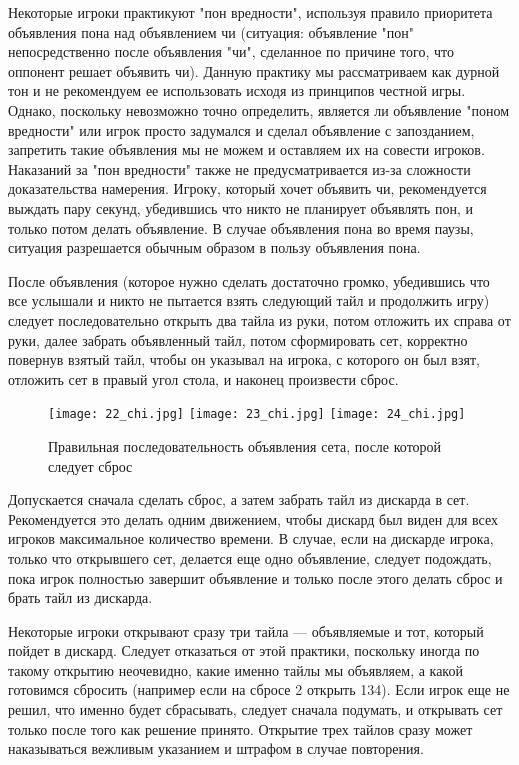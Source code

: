Некоторые игроки практикуют "пон вредности", используя правило приоритета объявления пона над объявлением чи (ситуация: объявление "пон" непосредственно после объявления "чи", сделанное по причине того, что оппонент решает объявить чи). Данную практику мы рассматриваем как дурной тон и не рекомендуем ее использовать исходя из принципов честной игры. Однако, поскольку невозможно точно определить, является ли объявление "поном вредности" или игрок просто задумался и сделал объявление с запозданием, запретить такие объявления мы не можем и оставляем их на совести игроков. Наказаний за "пон вредности" также не предусматривается из-за сложности доказательства намерения. Игроку, который хочет объявить чи, рекомендуется выждать пару секунд, убедившись что никто не планирует объявлять пон, и только потом делать объявление. В случае объявления пона во время паузы, ситуация разрешается обычным образом в пользу объявления пона.

После объявления (которое нужно сделать достаточно громко, убедившись что все услышали и никто не пытается взять следующий тайл и продолжить игру) следует последовательно открыть два тайла из руки, потом отложить их справа от руки, далее забрать объявленный тайл, потом сформировать сет, корректно повернув взятый тайл, чтобы он указывал на игрока, с которого он был взят, отложить сет в правый угол стола, и наконец произвести сброс.

\begin{figure}[H]
	\centering
	\texttt{[image: 22\_chi.jpg]}
	\texttt{[image: 23\_chi.jpg]}
	\texttt{[image: 24\_chi.jpg]}
	\caption{Правильная последовательность объявления сета, после которой следует сброс}
\end{figure}

Допускается сначала сделать сброс, а затем забрать тайл из дискарда в сет. Рекомендуется это делать одним движением, чтобы дискард был виден для всех игроков максимальное количество времени. В случае, если на дискарде игрока, только что открывшего сет, делается еще одно объявление, следует подождать, пока игрок полностью завершит объявление и только после этого делать сброс и брать тайл из дискарда.

Некоторые игроки открывают сразу три тайла --- объявляемые и тот, который пойдет в дискард. Следует отказаться от этой практики, поскольку иногда по такому открытию неочевидно, какие именно тайлы мы объявляем, а какой готовимся сбросить (например если на сбросе 2 открыть 134). Если игрок еще не решил, что именно будет сбрасывать, следует сначала подумать, и открывать сет только после того как решение принято. Открытие трех тайлов сразу может наказываться вежливым указанием и штрафом в случае повторения.

